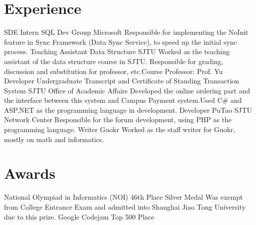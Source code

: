 \documentclass[10pt,a4paper,roman]{moderncv} %
\begin{document}
\section{Experience}
        {SDE Intern}
        {SQL Dev Group}
        {Microsoft}
        {}
        {Responsible for implementing the NoInit feature in Sync Framework (Data Sync Service), to speed up the initial sync process.}
        {Teaching Assistant}
        {Data Structure}
        {SJTU}
        {}
        {Worked as the teaching assistant of the data structure course in SJTU. Responsible for grading, discussion and substitution for professor, etc.\newline{}Course Professor: Prof. Yu\footnotemark{}}
        {Developer}
        {Undergraduate Transcript and Certificate of Standing Transaction System}
        {SJTU Office of Academic Affairs}
        {}
        {Developed the online ordering part and the interface between this system and Campus Payment system.\newline{}Used C\# and ASP.NET as the programming language in development.}
        {Developer}
        {PuTao\footnotemark{}}
        {SJTU Network Center}
        {}
        {Responsible for the forum development, using PHP as the programming language. }
        {Writer}
        {Guokr\footnotemark{}}
        {}
        {}
        {Worked as the staff writer for Guokr, mostly on math and informatics.}

\section{Awards}
        {National Olympiad in Informatics (NOI)}
        {46th Place}
        {Silver Medal}
        {}
        {Was exempt from College Entrance Exam and admitted into Shanghai Jiao Tong University due to this prize.}
        {Google Codejam}
        {Top 500 Place}
        {}{}{}
\end{document}
